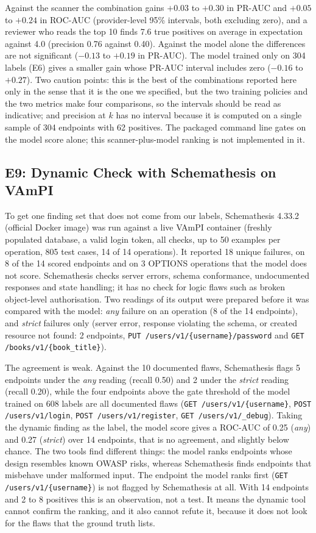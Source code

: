 \documentclass[conference]{IEEEtran}
\begin{document}
Against the scanner the combination gains $+0.03$ to $+0.30$ in PR-AUC and $+0.05$ to $+0.24$ in ROC-AUC (provider-level 95\% intervals, both excluding zero), and a reviewer
who reads the top 10 finds 7.6 true positives on average in expectation against 4.0 (precision 0.76 against 0.40). Against the model alone the differences are not
significant ($-0.13$ to $+0.19$ in PR-AUC). The model trained only on 304 labels (E6) gives a smaller gain whose PR-AUC interval includes zero ($-0.16$ to $+0.27$). Two caution points: this is the best of the combinations
reported here only in the sense that it is the one we specified, but the two training policies and the two metrics make four comparisons, so the intervals should be read as indicative; and precision at $k$ has no interval because it is computed on a single sample of 304 endpoints with 62 positives. The packaged command line gates on the model score alone; this scanner-plus-model ranking is not implemented in it.

\subsection{E9: Dynamic Check with Schemathesis on VAmPI}
\label{sec:e9}
To get one finding set that does not come from our labels, Schemathesis 4.33.2 (official Docker image) was run against a live VAmPI container
(freshly populated database, a valid login token, all checks, up to 50 examples per operation, 805 test cases, 14 of 14 operations). It reported 18 unique failures, on 8 of the 14 scored endpoints and on 3 OPTIONS operations that the model does not score.
Schemathesis checks server errors, schema conformance, undocumented responses and state handling; it has no check for logic flaws such as broken object-level authorisation.
Two readings of its output were prepared before it was compared with the model: \emph{any} failure on an operation (8 of the 14 endpoints), and \emph{strict} failures only (server error, response
violating the schema, or created resource not found: 2 endpoints, \texttt{PUT /users/v1/\{username\}/password} and \texttt{GET /books/v1/\{book\_title\}}).

The agreement is weak. Against the 10 documented flaws, Schemathesis flags 5 endpoints under the \emph{any} reading (recall 0.50) and 2 under the \emph{strict} reading (recall 0.20), while
the four endpoints above the gate threshold of the model trained on 608 labels are all documented flaws (\texttt{GET /users/v1/\{username\}}, \texttt{POST /users/v1/login}, \texttt{POST /users/v1/register}, \texttt{GET /users/v1/\_debug}).
Taking the dynamic finding as the label, the model score gives a ROC-AUC of 0.25 (\emph{any}) and 0.27 (\emph{strict}) over 14 endpoints, that is no agreement, and slightly below chance. The two tools find different things:
the model ranks endpoints whose design resembles known OWASP risks, whereas Schemathesis finds endpoints that misbehave under malformed input. The endpoint the model ranks first (\texttt{GET /users/v1/\{username\}}) is not flagged by Schemathesis at all.
With 14 endpoints and 2 to 8 positives this is an observation, not a test. It means the dynamic tool cannot confirm the ranking, and it also cannot refute it, because it does not look for the flaws that the ground truth lists.
\end{document}
